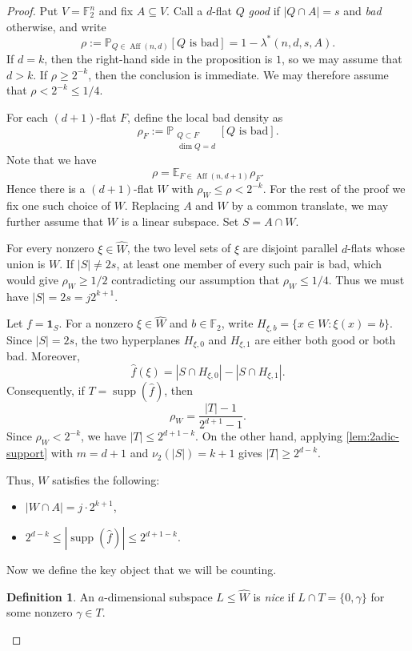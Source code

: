 \documentclass[reqno]{amsart}
\theoremstyle{definition}
\newtheorem{definition}[theorem]{Definition}
\theoremstyle{remark}
\newcommand{\F}{\mathbb F}
\newcommand{\E}{\mathbb E}
\renewcommand{\P}{\mathbb P}
\newcommand{\one}{\mathbf 1}
\DeclareMathOperator{\Aff}{Aff}
\DeclareMathOperator{\supp}{supp}
\begin{document}
\begin{proof}
Put $V=\F_2^n$ and fix $A\subseteq V$.  Call a $d$-flat $Q$
\emph{good} if $|Q\cap A|=s$ and \emph{bad} otherwise, and write
\[
  \rho:=\P_{Q\in\Aff(n,d)}[Q\text{ is bad}]
       =1-\lambda^*(n,d,s,A).
\]
If $d=k$, then the
right-hand side in the proposition is $1$, so we may assume that $d>k$.
If $\rho\ge2^{-k}$, then the conclusion is immediate.  We may therefore
assume that $\rho<2^{-k}\le1/4$.

For each $(d+1)$-flat $F$, define the local bad density as
\[
  \rho_F:=\P_{\substack{Q\subset F\\ \dim Q=d}}[Q\text{ is bad}].
\]
Note that we have
\[\rho=\E_{F\in\Aff(n,d+1)}\rho_F.\]
Hence there is a $(d+1)$-flat $W$ with $\rho_W\le\rho<2^{-k}$. For the rest of the proof we fix one such choice of $W$.
Replacing $A$ and $W$ by a common translate, we may further assume that $W$ is
a linear subspace.  Set $S=A\cap W$.

For every nonzero $\xi\in\widehat W$, the two level sets of $\xi$ are
disjoint parallel $d$-flats whose union is $W$.  If $|S|\ne2s$, at
least one member of every such pair is bad, which would give
$\rho_W\ge1/2$ contradicting our assumption that $\rho_W\le 1/4$.  Thus we must have $|S|=2s=j2^{k+1}$.

Let $f=\one_S$.  For a nonzero $\xi\in\widehat W$ and $b \in \F_2$, write
$H_{\xi,b}=\{x\in W:\xi(x)=b\}$.  Since $|S|=2s$, the two hyperplanes
$H_{\xi,0}$ and $H_{\xi,1}$ are either both good or both bad.  Moreover,
\[
  \widehat f(\xi)
  =|S\cap H_{\xi,0}|-|S\cap H_{\xi,1}|.
\]
Consequently, if $T=\supp(\widehat f)$, then
\[
  \rho_W=\frac{|T|-1}{2^{d+1}-1}.
\]
Since $\rho_W< 2^{-k}$, we have $|T|\le2^{d+1-k}$. On the other hand, applying \cref{lem:2adic-support} with $m=d+1$ and $\nu_2(|S|)=k+1$ gives $|T|\ge2^{d-k}$.

Thus, $W$ satisfies the following:
\begin{itemize}
    \item $|W\cap A| = j\cdot 2^{k+1}$,
    \item $2^{d-k}\le |\supp(\widehat{f})|\le 2^{d+1-k}$.
\end{itemize}

Now we define the key object that we will be counting.

\begin{definition}
An $a$-dimensional subspace $L\le\widehat W$ is \emph{nice} if $L\cap T=\{0,\gamma\}$ for some nonzero $\gamma\in T$.
\end{definition}


\end{proof}
\end{document}
